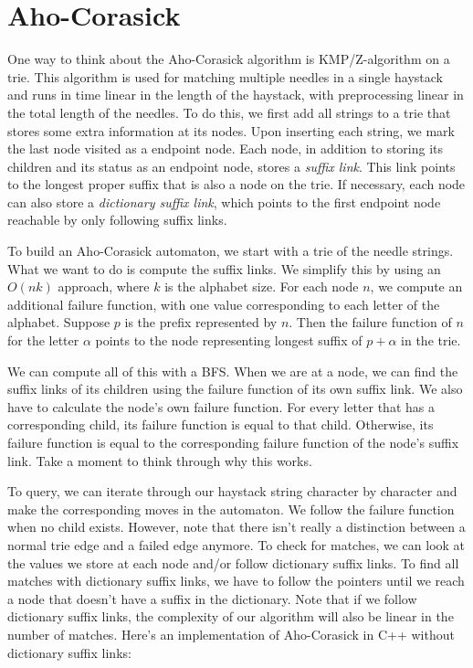 \section{Aho-Corasick}

One way to think about the Aho-Corasick algorithm is KMP/Z-algorithm on a trie. This algorithm is used for matching multiple needles in a single haystack and runs in time linear in the length of the haystack, with preprocessing linear in the total length of the needles. To do this, we first add all strings to a trie that stores some extra information at its nodes. Upon inserting each string, we mark the last node visited as a endpoint node. Each node, in addition to storing its children and its status as an endpoint node, stores a \emph{suffix link}. This link points to the longest proper suffix that is also a node on the trie. If necessary, each node can also store a \emph{dictionary suffix link}, which points to the first endpoint node reachable by only following suffix links.

To build an Aho-Corasick automaton, we start with a trie of the needle strings. What we want to do is compute the suffix links. We simplify this by using an $O(nk)$ approach, where $k$ is the alphabet size. For each node $n$, we compute an additional failure function, with one value corresponding to each letter of the alphabet. Suppose $p$ is the prefix represented by $n$. Then the failure function of $n$ for the letter $\alpha$ points to the node representing longest suffix of $p + \alpha$ in the trie.

We can compute all of this with a BFS. When we are at a node, we can find the suffix links of its children using the failure function of its own suffix link. We also have to calculate the node's own failure function. For every letter that has a corresponding child, its failure function is equal to that child. Otherwise, its failure function is equal to the corresponding failure function of the node's suffix link. Take a moment to think through why this works.

To query, we can iterate through our haystack string character by character and make the corresponding moves in the automaton. We follow the failure function when no child exists. However, note that there isn't really a distinction between a normal trie edge and a failed edge anymore. To check for matches, we can look at the values we store at each node and/or follow dictionary suffix links. To find all matches with dictionary suffix links, we have to follow the pointers until we reach a node that doesn't have a suffix in the dictionary. Note that if we follow dictionary suffix links, the complexity of our algorithm will also be linear in the number of matches. Here's an implementation of Aho-Corasick in C++ without dictionary suffix links:

